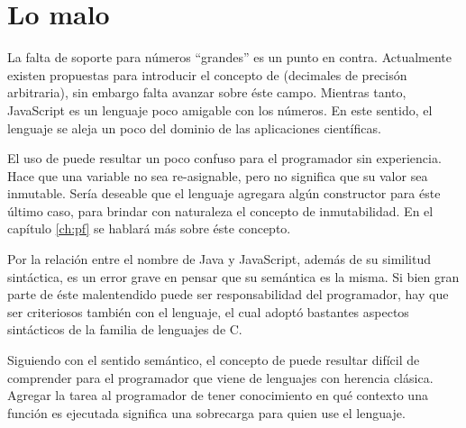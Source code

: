 \section*{Lo malo}

La falta de soporte para números "`grandes"' es un punto en contra. Actualmente existen propuestas para introducir el concepto de  (decimales de precisón arbitraria), sin embargo falta avanzar sobre éste campo. Mientras tanto, JavaScript es un lenguaje poco amigable con los números. En este sentido, el lenguaje se aleja un poco del dominio de las aplicaciones científicas.

El uso de  puede resultar un poco confuso para el programador sin experiencia. Hace que una variable no sea re-asignable, pero no significa que su valor sea inmutable. Sería deseable que el lenguaje agregara algún constructor para éste último caso, para brindar con naturaleza el concepto de inmutabilidad. En el capítulo \ref{ch:pf} se hablará más sobre éste concepto.

Por la relación entre el nombre de Java y JavaScript, además de su similitud sintáctica, es un error grave en pensar que su semántica es la misma. Si bien gran parte de éste malentendido puede ser responsabilidad del programador, hay que ser criteriosos también con el lenguaje, el cual adoptó bastantes aspectos sintácticos de la familia de lenguajes de C.

Siguiendo con el sentido semántico, el concepto de  puede resultar difícil de comprender para el programador que viene de lenguajes con herencia clásica. Agregar la tarea al programador de tener conocimiento en qué contexto una función es ejecutada significa una sobrecarga para quien use el lenguaje.